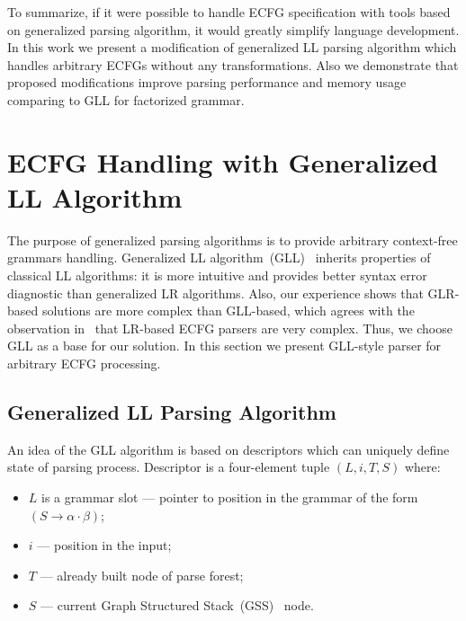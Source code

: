 \documentclass[runningheads,a4paper]{llncs}
\begin{document}
To summarize, if it were possible to handle ECFG specification with tools based on generalized parsing algorithm, it would greatly simplify language development.
In this work we present a modification of generalized LL parsing algorithm which handles arbitrary ECFGs without any transformations.
Also we demonstrate that proposed modifications improve parsing performance and memory usage comparing to GLL for factorized grammar.

\section{ECFG Handling with Generalized LL Algorithm}%

The purpose of generalized parsing algorithms is to provide arbitrary context-free grammars handling.
Generalized LL algorithm~(GLL)~\cite{scott2010gll} inherits properties of classical LL algorithms: it is more intuitive and provides better syntax error diagnostic than generalized LR algorithms.
Also, our experience shows that GLR-based solutions are more complex than GLL-based, which agrees with the observation in~\cite{ECFG} that LR-based ECFG parsers are very complex. 
Thus, we choose GLL as a base for our solution.
In this section we present GLL-style parser for arbitrary ECFG processing.

\subsection{Generalized LL Parsing Algorithm}%

An idea of the GLL algorithm is based on descriptors which can uniquely define state of parsing process.
Descriptor is a four-element tuple $(L, i, T, S)$ where: 
\begin{itemize}
\item $L$ is a grammar slot --- pointer to position in the grammar of the form~$(S \to \alpha \cdot \beta)$;
\item $i$ --- position in the input;
\item $T$ --- already built node of parse forest;
\item $S$ --- current Graph Structured Stack~(GSS)~\cite{afroozeh2015faster} node.
\end{itemize}
\end{document}
